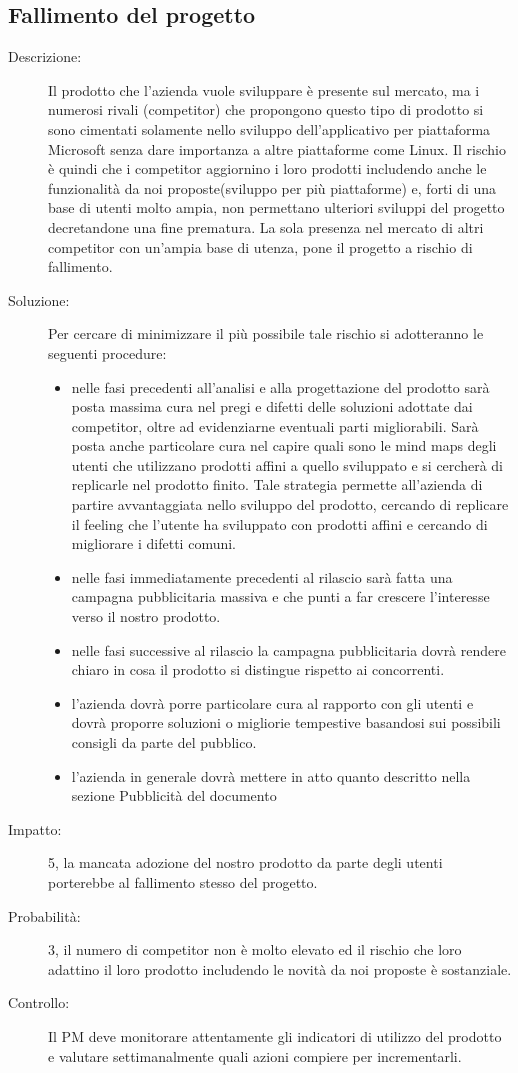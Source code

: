\subsection{Fallimento del progetto}
\begin{description}
\item[Descrizione:] Il prodotto che l'azienda vuole sviluppare è presente sul mercato, ma i numerosi rivali (competitor) che propongono questo tipo di prodotto si sono cimentati solamente nello sviluppo dell'applicativo per piattaforma Microsoft senza dare importanza a altre piattaforme come Linux.
Il rischio è quindi che i competitor aggiornino i loro prodotti includendo anche le
funzionalità da noi proposte(sviluppo per più piattaforme) e, forti di una base di utenti molto ampia, non permettano ulteriori sviluppi del progetto decretandone una fine prematura. La sola presenza nel mercato di altri competitor con un'ampia base di utenza, pone il progetto a rischio di fallimento.
\item[Soluzione:] Per cercare di minimizzare il più possibile tale rischio si adotteranno le
seguenti procedure:
\begin{itemize}
\item nelle fasi precedenti all'analisi e alla progettazione del prodotto sarà posta
massima cura nel pregi e difetti delle soluzioni adottate dai competitor, oltre ad evidenziarne eventuali parti
migliorabili. Sarà posta anche particolare cura nel capire quali sono le mind maps degli utenti che utilizzano prodotti affini a quello sviluppato e si cercherà di replicarle nel prodotto finito. Tale strategia permette all'azienda di partire avvantaggiata nello sviluppo del prodotto, cercando di replicare il feeling che l'utente ha sviluppato con prodotti affini e cercando di migliorare i difetti comuni.
\item nelle fasi immediatamente precedenti al rilascio sarà fatta una campagna
pubblicitaria massiva e che punti a far crescere l'interesse verso il nostro prodotto.
\item nelle fasi successive al rilascio la campagna pubblicitaria dovrà rendere chiaro
in cosa il prodotto si distingue rispetto ai concorrenti.
\item l'azienda dovrà porre particolare cura al rapporto con gli utenti e dovrà
proporre soluzioni o migliorie tempestive basandosi sui possibili consigli da parte del pubblico.
\item l'azienda in generale dovrà mettere in atto quanto descritto nella sezione Pubblicità  del documento
\end{itemize}
\item[Impatto:] 5, la mancata adozione del nostro prodotto da parte degli utenti porterebbe
al fallimento stesso del progetto.
\item[Probabilità:] 3, il numero di competitor non è molto elevato ed il rischio che loro adattino
il loro prodotto includendo le novità da noi proposte è sostanziale. 
\item[Controllo:] Il PM deve monitorare attentamente gli indicatori di utilizzo del prodotto
e valutare settimanalmente quali azioni compiere per incrementarli.
\end{description}

